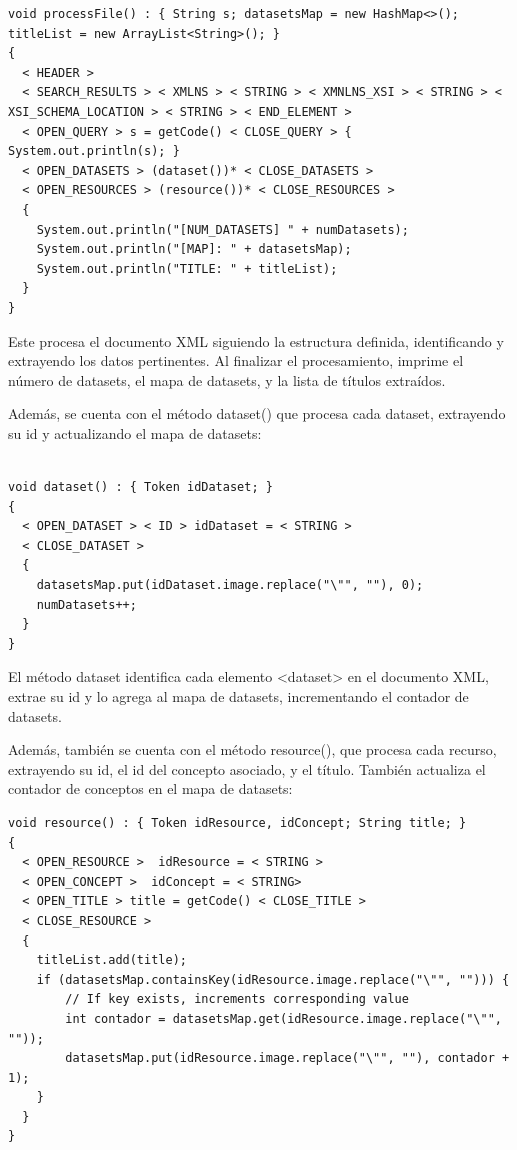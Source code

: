 \lstset{inputencoding=utf8/latin1}
\begin{lstlisting}
void processFile() : { String s; datasetsMap = new HashMap<>(); titleList = new ArrayList<String>(); }
{
  < HEADER > 
  < SEARCH_RESULTS > < XMLNS > < STRING > < XMNLNS_XSI > < STRING > < XSI_SCHEMA_LOCATION > < STRING > < END_ELEMENT > 
  < OPEN_QUERY > s = getCode() < CLOSE_QUERY > { System.out.println(s); }
  < OPEN_DATASETS > (dataset())* < CLOSE_DATASETS >
  < OPEN_RESOURCES > (resource())* < CLOSE_RESOURCES >
  {
    System.out.println("[NUM_DATASETS] " + numDatasets);
    System.out.println("[MAP]: " + datasetsMap);
    System.out.println("TITLE: " + titleList);
  }
}

\end{lstlisting}

Este procesa el documento XML siguiendo la estructura definida, identificando y extrayendo los datos pertinentes. Al finalizar el procesamiento, imprime el número de datasets, el mapa de datasets, y la lista de títulos extraídos.

Además, se cuenta con el método dataset() que procesa cada dataset, extrayendo su id y actualizando el mapa de datasets:

\lstset{inputencoding=utf8/latin1}
\begin{lstlisting}

void dataset() : { Token idDataset; } 
{
  < OPEN_DATASET > < ID > idDataset = < STRING > 
  < CLOSE_DATASET >
  {
    datasetsMap.put(idDataset.image.replace("\"", ""), 0);
    numDatasets++;
  }
}
\end{lstlisting}

El método dataset identifica cada elemento <dataset> en el documento XML, extrae su id y lo agrega al mapa de datasets, incrementando el contador de datasets.

Además, también se cuenta con el método resource(), que procesa cada recurso, extrayendo su id, el id del concepto asociado, y el título. También actualiza el contador de conceptos en el mapa de datasets:

\lstset{inputencoding=utf8/latin1}
\begin{lstlisting}
void resource() : { Token idResource, idConcept; String title; } 
{
  < OPEN_RESOURCE >  idResource = < STRING > 
  < OPEN_CONCEPT >  idConcept = < STRING>
  < OPEN_TITLE > title = getCode() < CLOSE_TITLE > 
  < CLOSE_RESOURCE >
  {
    titleList.add(title);
    if (datasetsMap.containsKey(idResource.image.replace("\"", ""))) {
        // If key exists, increments corresponding value
        int contador = datasetsMap.get(idResource.image.replace("\"", ""));
        datasetsMap.put(idResource.image.replace("\"", ""), contador + 1);
    } 
  }
}
\end{lstlisting}


